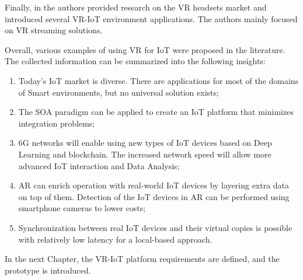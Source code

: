 Finally, in \cite{hu_virtual_2021} the authors provided research on the VR headsets market and introduced several VR-IoT environment applications. The authors mainly focused on VR streaming solutions.

Overall, various examples of using VR for IoT were proposed in the literature. The collected information can be summarized into the following insights:
\begin{enumerate}
    \item Today's IoT market is diverse. There are applications for most of the domains of Smart environments, but no universal solution exists;
   \item The SOA paradigm can be applied to create an IoT platform that minimizes integration problems;
    \item 6G networks will enable using new types of IoT devices based on Deep Learning and blockchain. The increased network speed will allow more advanced IoT interaction and Data Analysis;
    \item AR can enrich operation with real-world IoT devices by layering extra data on top of them. Detection of the IoT devices in AR can be performed using smartphone cameras to lower costs;
    \item Synchronization between real IoT devices and their virtual copies is possible with relatively low latency for a local-based approach.
\end{enumerate}

In the next Chapter, the VR-IoT platform requirements are defined, and the prototype is introduced.